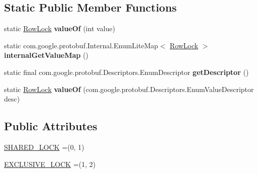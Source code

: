 \subsection*{Static Public Member Functions}
\begin{DoxyCompactItemize}
\item 
\mbox{\label{enumcom_1_1mysql_1_1cj_1_1x_1_1protobuf_1_1_mysqlx_crud_1_1_find_1_1_row_lock_ab9529e6c923fb78e3cee52f3845de864}} 
static \mbox{\hyperlink{enumcom_1_1mysql_1_1cj_1_1x_1_1protobuf_1_1_mysqlx_crud_1_1_find_1_1_row_lock}{Row\+Lock}} {\bfseries value\+Of} (int value)
\item 
\mbox{\label{enumcom_1_1mysql_1_1cj_1_1x_1_1protobuf_1_1_mysqlx_crud_1_1_find_1_1_row_lock_a435305edcec293f5df5df81fe544b4d5}} 
static com.\+google.\+protobuf.\+Internal.\+Enum\+Lite\+Map$<$ \mbox{\hyperlink{enumcom_1_1mysql_1_1cj_1_1x_1_1protobuf_1_1_mysqlx_crud_1_1_find_1_1_row_lock}{Row\+Lock}} $>$ {\bfseries internal\+Get\+Value\+Map} ()
\item 
\mbox{\label{enumcom_1_1mysql_1_1cj_1_1x_1_1protobuf_1_1_mysqlx_crud_1_1_find_1_1_row_lock_a1abfd70f50e5dfb2e668e65b48b55dfd}} 
static final com.\+google.\+protobuf.\+Descriptors.\+Enum\+Descriptor {\bfseries get\+Descriptor} ()
\item 
\mbox{\label{enumcom_1_1mysql_1_1cj_1_1x_1_1protobuf_1_1_mysqlx_crud_1_1_find_1_1_row_lock_ae8ed3e6cd9364e68ca360d0c35c4968c}} 
static \mbox{\hyperlink{enumcom_1_1mysql_1_1cj_1_1x_1_1protobuf_1_1_mysqlx_crud_1_1_find_1_1_row_lock}{Row\+Lock}} {\bfseries value\+Of} (com.\+google.\+protobuf.\+Descriptors.\+Enum\+Value\+Descriptor desc)
\end{DoxyCompactItemize}
\subsection*{Public Attributes}
\begin{DoxyCompactItemize}
\item 
\mbox{\hyperlink{enumcom_1_1mysql_1_1cj_1_1x_1_1protobuf_1_1_mysqlx_crud_1_1_find_1_1_row_lock_a7754006183dbdf7671396a2ddec6e74b}{S\+H\+A\+R\+E\+D\+\_\+\+L\+O\+CK}} =(0, 1)
\item 
\mbox{\hyperlink{enumcom_1_1mysql_1_1cj_1_1x_1_1protobuf_1_1_mysqlx_crud_1_1_find_1_1_row_lock_ac7bfbc64e9102fffbaccd2c09fdff117}{E\+X\+C\+L\+U\+S\+I\+V\+E\+\_\+\+L\+O\+CK}} =(1, 2)
\end{DoxyCompactItemize}
